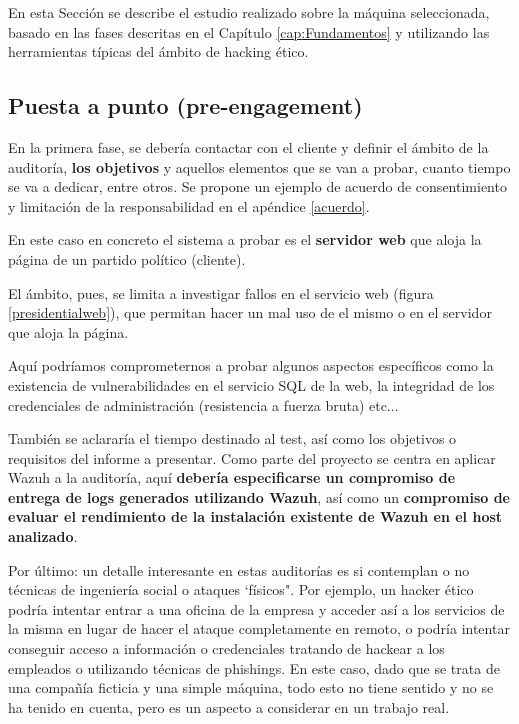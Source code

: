 En esta Sección se describe el estudio realizado sobre la máquina seleccionada, basado en las fases descritas en el Capítulo \ref{cap:Fundamentos} y utilizando las herramientas típicas del ámbito de hacking ético.


\subsection{Puesta a punto (pre-engagement)}

En la primera fase, se debería contactar con el cliente y definir el ámbito de la auditoría, \textbf{los objetivos} y aquellos elementos que se van a probar, cuanto tiempo se va a dedicar, entre otros. Se propone un ejemplo de acuerdo de consentimiento y limitación de la responsabilidad en el apéndice \ref{acuerdo}.

En este caso en concreto el sistema a probar es el \textbf{servidor web} que aloja la página de un partido político (cliente). 

El ámbito, pues, se limita a investigar fallos en el servicio web (figura \ref{presidentialweb}), que permitan hacer un mal uso de el mismo o en el servidor que aloja la página. 

Aquí podríamos comprometernos a probar algunos aspectos específicos como la existencia de vulnerabilidades en el servicio SQL de la web, la integridad de los credenciales de administración (resistencia a fuerza bruta) etc... 

También se aclararía el tiempo destinado al test, así como los objetivos o requisitos del informe a presentar. Como parte del proyecto se centra en aplicar Wazuh a la auditoría, aquí \textbf{debería especificarse un compromiso de entrega de logs generados utilizando Wazuh}, así como un \textbf{compromiso de evaluar el rendimiento de la instalación existente de Wazuh en el host analizado}.

Por último: un detalle interesante en estas auditorías es si contemplan o no técnicas de ingeniería social o ataques `físicos". Por ejemplo, un hacker ético podría intentar entrar a una oficina de la empresa y acceder así a los servicios de la misma en lugar de hacer el ataque completamente en remoto, o podría intentar conseguir acceso a información o credenciales tratando de hackear a los empleados o utilizando técnicas de \Glspl{phishing}. En este caso, dado que se trata de una compañía ficticia y una simple máquina, todo esto no tiene sentido y no se ha tenido en cuenta, pero es un aspecto a considerar en un trabajo real.

